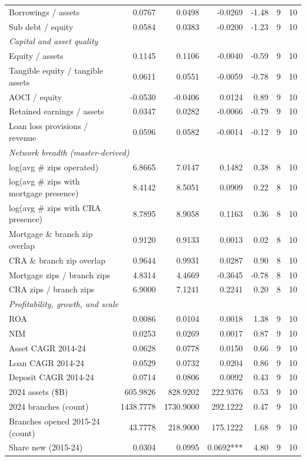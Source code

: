 \begin{tabular}{lrrrrrr}
Borrowings / assets & 0.0767 & 0.0498 & -0.0269 & -1.48 & 9 & 10 \\
Sub debt / equity & 0.0584 & 0.0383 & -0.0200 & -1.23 & 9 & 10 \\
\midrule
\multicolumn{7}{l}{\emph{Capital and asset quality}} \\
\midrule
Equity / assets & 0.1145 & 0.1106 & -0.0040 & -0.59 & 9 & 10 \\
Tangible equity / tangible assets & 0.0611 & 0.0551 & -0.0059 & -0.78 & 9 & 10 \\
AOCI / equity & -0.0530 & -0.0406 & 0.0124 & 0.89 & 9 & 10 \\
Retained earnings / assets & 0.0347 & 0.0282 & -0.0066 & -0.79 & 9 & 10 \\
Loan loss provisions / revenue & 0.0596 & 0.0582 & -0.0014 & -0.12 & 9 & 10 \\
\midrule
\multicolumn{7}{l}{\emph{Network breadth (master-derived)}} \\
\midrule
log(avg \# zips operated) & 6.8665 & 7.0147 & 0.1482 & 0.38 & 8 & 10 \\
log(avg \# zips with mortgage presence) & 8.4142 & 8.5051 & 0.0909 & 0.22 & 8 & 10 \\
log(avg \# zips with CRA presence) & 8.7895 & 8.9058 & 0.1163 & 0.36 & 8 & 10 \\
Mortgage \& branch zip overlap & 0.9120 & 0.9133 & 0.0013 & 0.02 & 8 & 10 \\
CRA \& branch zip overlap & 0.9644 & 0.9931 & 0.0287 & 0.90 & 8 & 10 \\
Mortgage zips / branch zips & 4.8314 & 4.4669 & -0.3645 & -0.78 & 8 & 10 \\
CRA zips / branch zips & 6.9000 & 7.1241 & 0.2241 & 0.20 & 8 & 10 \\
\midrule
\multicolumn{7}{l}{\emph{Profitability, growth, and scale}} \\
\midrule
ROA & 0.0086 & 0.0104 & 0.0018 & 1.38 & 9 & 10 \\
NIM & 0.0253 & 0.0269 & 0.0017 & 0.87 & 9 & 10 \\
Asset CAGR 2014-24 & 0.0628 & 0.0778 & 0.0150 & 0.66 & 9 & 10 \\
Loan CAGR 2014-24 & 0.0529 & 0.0732 & 0.0204 & 0.86 & 9 & 10 \\
Deposit CAGR 2014-24 & 0.0714 & 0.0806 & 0.0092 & 0.43 & 9 & 10 \\
2024 assets (\$B) & 605.9826 & 828.9202 & 222.9376 & 0.53 & 9 & 10 \\
2024 branches (count) & 1438.7778 & 1730.9000 & 292.1222 & 0.47 & 9 & 10 \\
Branches opened 2015-24 (count) & 43.7778 & 218.9000 & 175.1222 & 1.68 & 9 & 10 \\
Share new (2015-24) & 0.0304 & 0.0995 & 0.0692*** & 4.80 & 9 & 10 \\
\bottomrule
\end{tabular}

